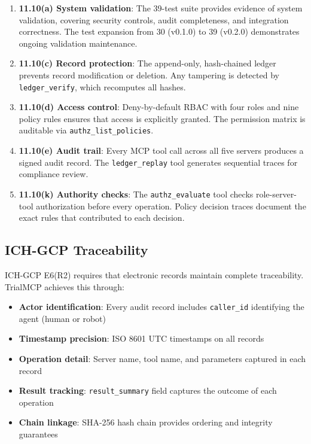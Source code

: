 \documentclass[10pt,letterpaper]{article}
\begin{document}
\begin{enumerate}[leftmargin=2em]
    \item \textbf{11.10(a) System validation}: The 39-test suite provides evidence of system validation, covering security controls, audit completeness, and integration correctness. The test expansion from 30 (v0.1.0) to 39 (v0.2.0) demonstrates ongoing validation maintenance.

    \item \textbf{11.10(c) Record protection}: The append-only, hash-chained ledger prevents record modification or deletion. Any tampering is detected by \texttt{ledger\_verify}, which recomputes all hashes.

    \item \textbf{11.10(d) Access control}: Deny-by-default RBAC with four roles and nine policy rules ensures that access is explicitly granted. The permission matrix is auditable via \texttt{authz\_list\_policies}.

    \item \textbf{11.10(e) Audit trail}: Every MCP tool call across all five servers produces a signed audit record. The \texttt{ledger\_replay} tool generates sequential traces for compliance review.

    \item \textbf{11.10(k) Authority checks}: The \texttt{authz\_evaluate} tool checks role-server-tool authorization before every operation. Policy decision traces document the exact rules that contributed to each decision.
\end{enumerate}

\subsection{ICH-GCP Traceability}

ICH-GCP E6(R2) \cite{ichgcp2016} requires that electronic records maintain complete traceability. TrialMCP achieves this through:

\begin{itemize}[leftmargin=2em]
    \item \textbf{Actor identification}: Every audit record includes \texttt{caller\_id} identifying the agent (human or robot)
    \item \textbf{Timestamp precision}: ISO 8601 UTC timestamps on all records
    \item \textbf{Operation detail}: Server name, tool name, and parameters captured in each record
    \item \textbf{Result tracking}: \texttt{result\_summary} field captures the outcome of each operation
    \item \textbf{Chain linkage}: SHA-256 hash chain provides ordering and integrity guarantees
\end{itemize}
\end{document}
